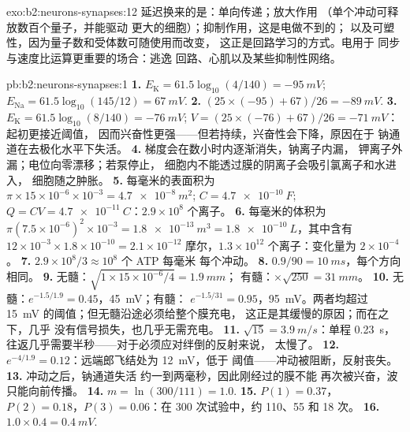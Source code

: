 \begin{solution}{exo:b2:neurons-synapses:12}
延迟换来的是：单向传递；放大作用
（单个冲动可释放数百个量子，并能驱动
更大的细胞）；抑制作用，这是电做不到的；
以及可塑性，因为量子数和受体数可随使用而改变，
这正是回路学习的方式。电用于
同步与速度比运算更重要的场合：逃逸
回路、心肌以及某些抑制性网络。
\end{solution}

\begin{solution}{pb:b2:neurons-synapses:1}
\textbf{1.} $E_{\mathrm K} = 61.5\log_{10}(4/140) = \qty{-95}{mV}$;
$E_{\mathrm{Na}} = 61.5\log_{10}(145/12) = \qty{+67}{mV}$.
\textbf{2.} $(25\times(-95) + 67)/26 = \qty{-89}{mV}$.
\textbf{3.} $E_{\mathrm K} = 61.5\log_{10}(8/140) = \qty{-76}{mV}$;
$V = (25\times(-76) + 67)/26 = \qty{-71}{mV}$：起初更接近阈值，
因而兴奋性更强——但若持续，兴奋性会下降，原因在于
钠通道在去极化水平下失活。
\textbf{4.} 梯度会在数小时内逐渐消失，钠离子内漏，
钾离子外漏；电位向零漂移；若泵停止，
细胞内不能透过膜的阴离子会吸引氯离子和水进入，
细胞随之肿胀。
\textbf{5.} 每毫米的表面积为 $\pi\times 15\times 10^{-6}\times
10^{-3} = \qty{4.7e-8}{m^2}$; $C = \qty{4.7e-10}{F}$; $Q = CV =
\qty{4.7e-11}{C}$：$2.9\times 10^{8}$ 个离子。
\textbf{6.} 每毫米的体积为 $\pi(7.5\times 10^{-6})^{2}\times
10^{-3} = \qty{1.8e-13}{m^3} = \qty{1.8e-10}{L}$，其中含有 $12\times
10^{-3}\times 1.8\times 10^{-10} = 2.1\times 10^{-12}$ 摩尔，$1.3\times
10^{12}$ 个离子：变化量为 $2\times 10^{-4}$。
\textbf{7.} $2.9\times 10^{8}/3 \approx 10^{8}$ 个 ATP 每毫米
每个冲动。
\textbf{8.} $0.9/90 = \qty{10}{ms}$，每个方向相同。
\textbf{9.} 无髓：$\sqrt{1\times 15\times 10^{-6}/4} = \qty{1.9}{mm}$；
有髓：$\times\sqrt{250} = \qty{31}{mm}$。
\textbf{10.} 无髓：$e^{-1.5/1.9} = 0.45$，\qty{45}{mV}；有髓：
$e^{-1.5/31} = 0.95$，\qty{95}{mV}。两者均超过 \qty{15}{mV}
的阈值；但无髓沿途必须给整个膜充电，
这正是其缓慢的原因；而在之下，几乎
没有信号损失，也几乎无需充电。
\textbf{11.} $\sqrt{15} = \qty{3.9}{m/s}$：单程 \qty{0.23}{s}，
往返几乎需要半秒——对于必须应对绊倒的反射来说，
太慢了。
\textbf{12.} $e^{-4/1.9} = 0.12$：远端郎飞结处为 \qty{12}{mV}，低于
阈值——冲动被阻断，反射丧失。
\textbf{13.} 冲动之后，钠通道失活
约一到两毫秒，因此刚经过的膜不能
再次被兴奋，波只能向前传播。
\textbf{14.} $m = \ln(300/111) = 1.0$.
\textbf{15.} $P(1) = 0.37$，$P(2) = 0.18$，$P(3) = 0.06$：在 300 次试验中，约 110、55
和 18 次。
\textbf{16.} $1.0\times 0.4 = \qty{0.4}{mV}$.

\end{solution}
